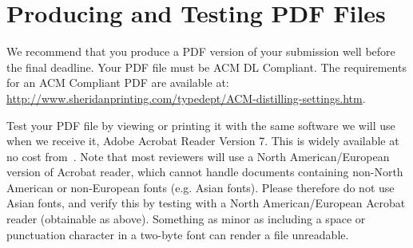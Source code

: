 \section{Producing and Testing PDF Files}

We recommend that you produce a PDF version of your submission well
                                before the final deadline.  Your PDF file must be ACM DL
                                Compliant. The requirements for an ACM Compliant PDF are available at:
                                {\url{http://www.sheridanprinting.com/typedept/ACM-distilling-settings.htm}}.

Test your PDF file by viewing or printing it with the same software we
                                will use when we receive it, Adobe Acrobat Reader Version 7. This is
                                widely available at no cost from~\cite{acrobat}.  Note that most
                                reviewers will use a North American/European version of Acrobat
                                reader, which cannot handle documents containing non-North American or
                                non-European fonts (e.g. Asian fonts).  Please therefore do not use
                                Asian fonts, and verify this by testing with a North American/European
                                Acrobat reader (obtainable as above). Something as minor as including
                                a space or punctuation character in a two-byte font can render a file
                                unreadable.